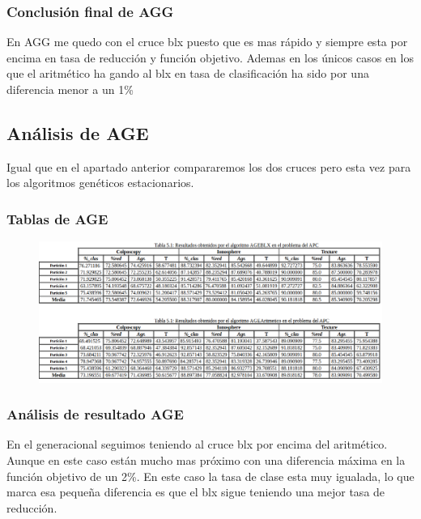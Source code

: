 \documentclass[titlepage]{article}
\begin{document}
	\subsubsection{Conclusión final de AGG}
	En AGG me quedo con el cruce blx puesto que es mas rápido y siempre esta por encima en tasa de reducción y función objetivo. Ademas en los únicos casos en los que el aritmético ha gando al blx en tasa de clasificación ha sido por una diferencia menor a un 1\%
	
	\subsection{Análisis de AGE}
	Igual que en el apartado anterior compararemos los dos cruces pero esta vez para los algoritmos genéticos estacionarios.
	
	\subsubsection{Tablas de AGE}
	\begin{figure}[H]
		\centering
		\includegraphics[width=1\linewidth]{screenshot006}
		\caption{}
		\label{fig:screenshot006}
	\end{figure}
	
	
	\subsubsection{Análisis de resultado AGE}
	En el generacional seguimos teniendo al cruce blx por encima del aritmético. Aunque en este caso están mucho mas próximo con una diferencia máxima en la función objetivo de un 2\%. En este caso la tasa de clase esta muy igualada, lo que marca esa pequeña diferencia es que el blx sigue teniendo una mejor tasa de reducción.
	
\end{document}
